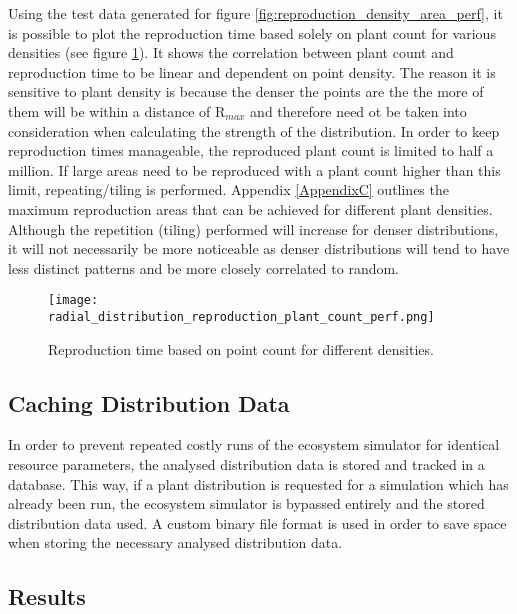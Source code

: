 Using the test data generated for figure \ref{fig:reproduction_density_area_perf}, it is possible to plot the reproduction time based solely on plant count for various densities (see figure \ref{fig:reproduction_plant_count_perf}). It shows the correlation between plant count and reproduction time to be linear and dependent on point density. The reason it is sensitive to plant density is because the denser the points are the the more of them will be within a distance of R$_{max}$ and therefore need ot be taken into consideration when calculating the strength of the distribution. In order to keep reproduction times manageable, the reproduced plant count is limited to half a million. If large areas need to be reproduced with a plant count higher than this limit, repeating/tiling is performed. Appendix \ref{AppendixC} outlines the maximum reproduction areas that can be achieved for different plant densities. Although the repetition (tiling) performed will increase for denser distributions, it will not necessarily be more noticeable as denser distributions will tend to have less distinct patterns and be more closely correlated to random.\\

\begin{figure}
\center
	\texttt{[image: radial\_distribution\_reproduction\_plant\_count\_perf.png]}
	\caption{ Reproduction time based on point count for different densities.}	
	\label{fig:reproduction_plant_count_perf}
\end{figure}

\subsection{Caching Distribution Data}

In order to prevent repeated costly runs of the ecosystem simulator for identical resource parameters, the analysed distribution data is stored and tracked in a database. This way, if a plant distribution is requested for a simulation which has already been run, the ecosystem simulator is bypassed entirely and the stored distribution data used. A custom binary file format is used in order to save space when storing the necessary analysed distribution data.

\subsection{Results}

